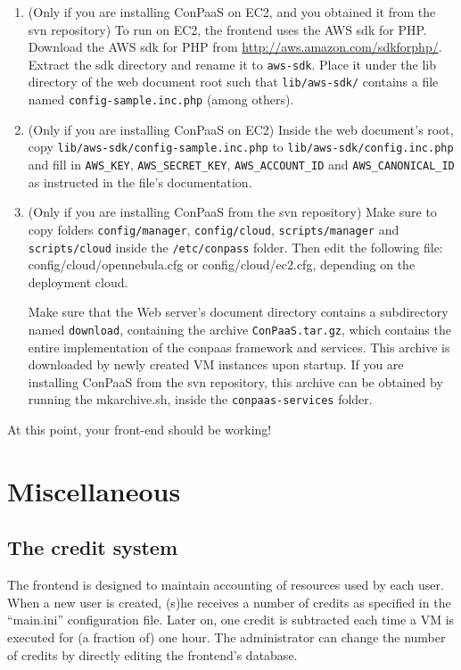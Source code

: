 \documentclass[10pt]{article}
\begin{document}
\begin{enumerate}
\item (Only if you are installing ConPaaS on EC2, and you obtained it 
  from the svn repository) To run on EC2, the frontend uses the AWS
  sdk for PHP. Download the AWS sdk for PHP from
  \url{http://aws.amazon.com/sdkforphp/}.  Extract the sdk directory
  and rename it to \verb+aws-sdk+. Place it under the lib directory of
  the web document root such that \verb+lib/aws-sdk/+ contains a
  file named \verb+config-sample.inc.php+ (among others).

\item (Only if you are installing ConPaaS on EC2) 
  Inside the web document's root, copy
  \verb+lib/aws-sdk/config-sample.inc.php+ to
  \verb+lib/aws-sdk/config.inc.php+ and fill in \verb+AWS_KEY+,
  \verb+AWS_SECRET_KEY+, \verb+AWS_ACCOUNT_ID+ and
  \verb+AWS_CANONICAL_ID+ as instructed in the file's documentation.

\item (Only if you are installing ConPaaS from the svn repository)
  Make sure to copy folders \verb+config/manager+, \verb+config/cloud+,
  \verb+scripts/manager+ and \verb+scripts/cloud+ inside the 
  \verb+/etc/conpass+ folder. Then edit the 
  following file: config/cloud/opennebula.cfg or config/cloud/ec2.cfg,
  depending on the deployment cloud.

  Make sure that the Web server's document directory contains a
  subdirectory named \verb+download+, containing the archive
  \verb+ConPaaS.tar.gz+, which contains the entire implementation
  of the conpaas framework and services. This archive is downloaded by newly
  created VM instances upon startup. If you are installing ConPaaS from the svn
  repository, this archive can be obtained
  by running the mkarchive.sh, inside the \verb+conpaas-services+ folder.

\end{enumerate}

At this point, your front-end should be working!

\section{Miscellaneous}
\label{sec:misc}

\subsection{The credit system}

The frontend is designed to maintain accounting of resources used by
each user. When a new user is created, (s)he receives a number of
credits as specified in the ``main.ini'' configuration file. Later on,
one credit is subtracted each time a VM is executed for (a fraction
of) one hour. The administrator can change the number of credits by
directly editing the frontend's database. 
\end{document}
